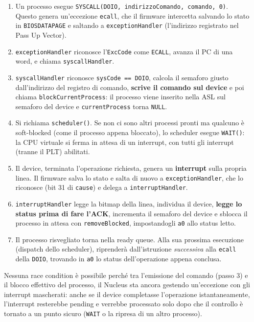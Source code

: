 \documentclass[11pt,a4paper]{article}
\newcommand{\code}[1]{\texttt{#1}}
\begin{document}
\begin{enumerate}
\item Un processo esegue \code{SYSCALL(DOIO, indirizzoComando, comando, 0)}.
  Questo genera un'eccezione \code{ecall}, che il firmware intercetta
  salvando lo stato in \code{BIOSDATAPAGE} e saltando a
  \code{exceptionHandler} (l'indirizzo registrato nel Pass Up Vector).
\item \code{exceptionHandler} riconosce l'\code{ExcCode} come \code{ECALL},
  avanza il PC di una word, e chiama \code{syscallHandler}.
\item \code{syscallHandler} riconosce \code{sysCode == DOIO}, calcola il
  semaforo giusto dall'indirizzo del registro di comando, \textbf{scrive il
  comando sul device} e poi chiama \code{blockCurrentProcess}: il processo
  viene inserito nella ASL sul semaforo del device e \code{currentProcess}
  torna \code{NULL}.
\item Si richiama \code{scheduler()}. Se non ci sono altri processi pronti
  ma qualcuno è soft-blocked (come il processo appena bloccato), lo
  scheduler esegue \code{WAIT()}: la CPU virtuale si ferma in attesa di un
  interrupt, con tutti gli interrupt (tranne il PLT) abilitati.
\item Il device, terminata l'operazione richiesta, genera un
  \textbf{interrupt} sulla propria linea. Il firmware salva lo stato e
  salta di nuovo a \code{exceptionHandler}, che lo riconosce (bit 31 di
  \code{cause}) e delega a \code{interruptHandler}.
\item \code{interruptHandler} legge la bitmap della linea, individua il
  device, \textbf{legge lo status prima di fare l'ACK}, incrementa il
  semaforo del device e sblocca il processo in attesa con
  \code{removeBlocked}, impostandogli \code{a0} allo status letto.
\item Il processo risvegliato torna nella ready queue. Alla sua prossima
  esecuzione (dispatch dello scheduler), riprenderà dall'istruzione
  \emph{successiva} alla \code{ecall} della \code{DOIO}, trovando in
  \code{a0} lo status dell'operazione appena conclusa.
\end{enumerate}
Nessuna race condition è possibile perché tra l'emissione del comando (passo
3) e il blocco effettivo del processo, il Nucleus sta ancora gestendo
un'eccezione con gli interrupt mascherati: anche se il device completasse
l'operazione istantaneamente, l'interrupt resterebbe pending e verrebbe
processato solo dopo che il controllo è tornato a un punto sicuro
(\code{WAIT} o la ripresa di un altro processo).
\end{document}

